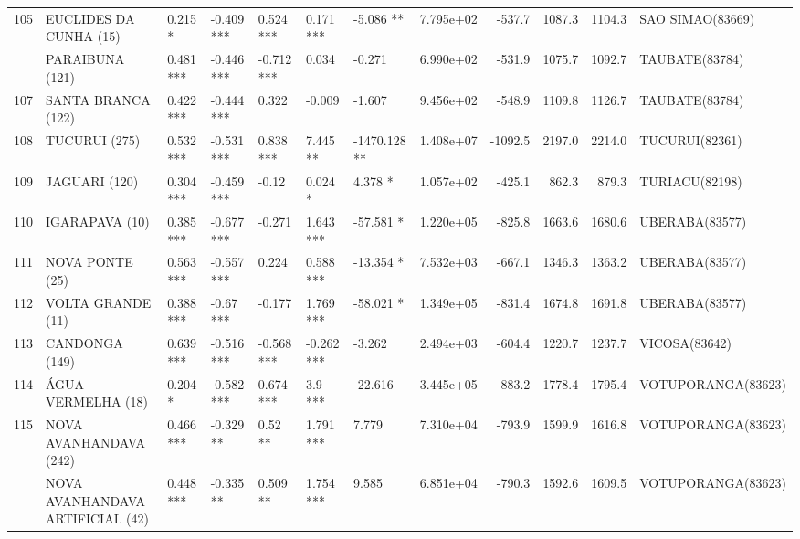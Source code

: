 \documentclass[12pt,oneside]{book}\usepackage[]{graphicx}\usepackage[]{color}
\newenvironment{knitrout}{}{} %
\theoremstyle{definition} %
\begin{document}
\begin{knitrout}
\begin{landscape}
\begin{table}
{\begin{tabular}[t]{lllllllrrrrl}
\rowcolor{gray!6}  105 & EUCLIDES DA CUNHA (15) & 0.215 * & -0.409 *** & 0.524 *** & 0.171 *** & -5.086 ** & 7.795e+02 & -537.7 & 1087.3 & 1104.3 & SAO SIMAO(83669)\\
\addlinespace
106 & PARAIBUNA (121) & 0.481 *** & -0.446 *** & -0.712 *** & 0.034 & -0.271 & 6.990e+02 & -531.9 & 1075.7 & 1092.7 & TAUBATE(83784)\\
\rowcolor{gray!6}  107 & SANTA BRANCA (122) & 0.422 *** & -0.444 *** & 0.322 & -0.009 & -1.607 & 9.456e+02 & -548.9 & 1109.8 & 1126.7 & TAUBATE(83784)\\
108 & TUCURUI (275) & 0.532 *** & -0.531 *** & 0.838 *** & 7.445 ** & -1470.128 ** & 1.408e+07 & -1092.5 & 2197.0 & 2214.0 & TUCURUI(82361)\\
\rowcolor{gray!6}  109 & JAGUARI (120) & 0.304 *** & -0.459 *** & -0.12 & 0.024 * & 4.378 * & 1.057e+02 & -425.1 & 862.3 & 879.3 & TURIACU(82198)\\
110 & IGARAPAVA (10) & 0.385 *** & -0.677 *** & -0.271 & 1.643 *** & -57.581 * & 1.220e+05 & -825.8 & 1663.6 & 1680.6 & UBERABA(83577)\\
\addlinespace
\rowcolor{gray!6}  111 & NOVA PONTE (25) & 0.563 *** & -0.557 *** & 0.224 & 0.588 *** & -13.354 * & 7.532e+03 & -667.1 & 1346.3 & 1363.2 & UBERABA(83577)\\
112 & VOLTA GRANDE (11) & 0.388 *** & -0.67 *** & -0.177 & 1.769 *** & -58.021 * & 1.349e+05 & -831.4 & 1674.8 & 1691.8 & UBERABA(83577)\\
\rowcolor{gray!6}  113 & CANDONGA (149) & 0.639 *** & -0.516 *** & -0.568 *** & -0.262 *** & -3.262 & 2.494e+03 & -604.4 & 1220.7 & 1237.7 & VICOSA(83642)\\
114 & ÁGUA VERMELHA (18) & 0.204 * & -0.582 *** & 0.674 *** & 3.9 *** & -22.616 & 3.445e+05 & -883.2 & 1778.4 & 1795.4 & VOTUPORANGA(83623)\\
\rowcolor{gray!6}  115 & NOVA AVANHANDAVA (242) & 0.466 *** & -0.329 ** & 0.52 ** & 1.791 *** & 7.779 & 7.310e+04 & -793.9 & 1599.9 & 1616.8 & VOTUPORANGA(83623)\\
\addlinespace
116 & NOVA AVANHANDAVA ARTIFICIAL (42) & 0.448 *** & -0.335 ** & 0.509 ** & 1.754 *** & 9.585 & 6.851e+04 & -790.3 & 1592.6 & 1609.5 & VOTUPORANGA(83623)\\
\bottomrule
\end{tabular}}
\end{table}
\end{landscape}


\end{knitrout}
\end{document}
